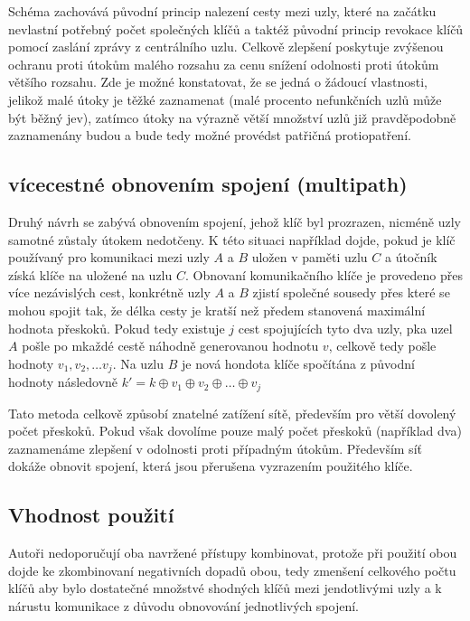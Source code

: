 \documentclass[11pt,final,twoside]{fithesis2}
\begin{document}
Schéma zachovává původní princip nalezení cesty mezi uzly, které na začátku nevlastní potřebný počet společných klíčů a taktéž původní princip revokace klíčů pomocí zaslání zprávy z 
centrálního uzlu. Celkově zlepšení poskytuje zvýšenou ochranu proti útokům malého rozsahu za cenu snížení odolnosti proti útokům většího rozsahu. Zde je možné konstatovat, že se jedná 
o žádoucí vlastnosti, jelikož malé útoky je těžké zaznamenat (malé procento nefunkčních uzlů může být běžný jev), zatímco útoky na výrazně větší množství uzlů již pravděpodobně zaznamenány budou a 
bude tedy možné provédst patřičná protiopatření. 

\subsection{vícecestné obnovením spojení (multipath)}
Druhý návrh se zabývá obnovením spojení, jehož klíč byl prozrazen, nicméně uzly samotné zůstaly útokem nedotčeny. K této situaci například dojde, pokud je klíč používaný pro komunikaci mezi
uzly $A$ a $B$ uložen v paměti uzlu $C$ a útočník získá klíče na uložené na uzlu $C$. Obnovaní komunikačního klíče je provedeno přes více nezávislých cest, konkrétně uzly $A$ a $B$ zjistí společné sousedy
přes které se mohou spojit tak, že délka cesty je kratší než předem stanovená maximální hodnota přeskoků. Pokud tedy existuje $j$ cest spojujících tyto dva uzly, pka uzel $A$ pošle po mkaždé cestě náhodně 
generovanou hodnotu $v$, celkově tedy pošle hodnoty $v_1, v_2, \dots v_j$. Na uzlu $B$ je nová hondota klíče spočítána z původní hodnoty následovně $k' = k \oplus v_1 \oplus v_2 \oplus \dots \oplus v_j$

Tato metoda celkově způsobí znatelné zatížení sítě, především pro větší dovolený počet přeskoků. Pokud však dovolíme pouze malý počet přeskoků (například dva) zaznamenáme zlepšení v odolnosti proti 
případným útokům. Především síť dokáže obnovit spojení, která jsou přerušena vyzrazením použitého klíče.

\subsection{Vhodnost použití}
Autoři nedoporučují oba navržené přístupy kombinovat, protože při použití obou dojde ke zkombinovaní negativních dopadů obou, tedy zmenšení celkového počtu klíčů aby bylo dostatečné množstvé shodných
klíčů mezi jendotlivými uzly a k nárustu komunikace z důvodu obnovování jednotlivých spojení. 
\end{document}
